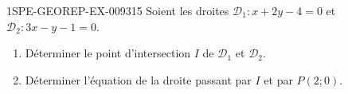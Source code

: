 \begin{exercice}{1SPE-GEOREP-EX-009}{3}{15}
Soient les droites $\mathcal{D}_1 : x + 2y - 4 = 0$ et $\mathcal{D}_2 : 3x - y - 1 = 0$.
\begin{enumerate}
  \item Déterminer le point d'intersection $I$ de $\mathcal{D}_1$ et $\mathcal{D}_2$.
  \item Déterminer l'équation de la droite passant par $I$ et par $P(2 ; 0)$.
\end{enumerate}
\end{exercice}
